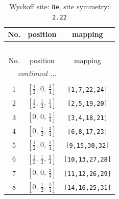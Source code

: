 \documentclass[fleqn,8pt]{jsarticle}
\begin{document}
\renewcommand{\arraystretch}{1.2}
\begin{longtable}{ccc}
\caption{Wyckoff site: {\tt 8e}, site symmetry: {\tt 2.22}}
 \\
 \hline \hline
No. & position & mapping \\ \hline \endfirsthead

\multicolumn{2}{l}{\tablename\ \thetable{}} \\
 \hline \hline
No. & position & mapping \\ \hline \endhead

 \hline \hline
\multicolumn{2}{r}{\footnotesize\it continued ...} \\ \endfoot

 \hline \hline
\multicolumn{2}{r}{} \\ \endlastfoot

1 & $\left[ \frac{1}{2},\, 0,\, \frac{3}{4} \right]$ & {\tt [1,7,22,24]} \\ \hline
2 & $\left[ \frac{1}{2},\, \frac{1}{2},\, \frac{1}{4} \right]$ & {\tt [2,5,19,20]} \\ \hline
3 & $\left[ 0,\, 0,\, \frac{1}{4} \right]$ & {\tt [3,4,18,21]} \\ \hline
4 & $\left[ 0,\, \frac{1}{2},\, \frac{3}{4} \right]$ & {\tt [6,8,17,23]} \\ \hline
5 & $\left[ \frac{1}{2},\, 0,\, \frac{1}{4} \right]$ & {\tt [9,15,30,32]} \\ \hline
6 & $\left[ \frac{1}{2},\, \frac{1}{2},\, \frac{3}{4} \right]$ & {\tt [10,13,27,28]} \\ \hline
7 & $\left[ 0,\, 0,\, \frac{3}{4} \right]$ & {\tt [11,12,26,29]} \\ \hline
8 & $\left[ 0,\, \frac{1}{2},\, \frac{1}{4} \right]$ & {\tt [14,16,25,31]} \\
\end{longtable}
\renewcommand{\arraystretch}{1.2}
\end{document}

